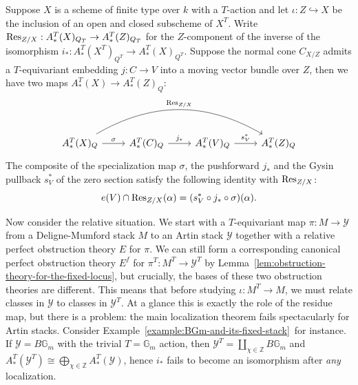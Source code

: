 \documentclass[12pt,dvipsnames]{amsart}
\begin{document}

\begin{prop}\label{rl-000R}\label{prop:edidin-graham-residue-identity}
  Suppose \(X\) is a scheme of finite type over \(k\) with a \(T\)-action and let \(\iota:Z\hookrightarrow X\) be the inclusion of an open and closed subscheme of \(X^T\). Write \(\operatorname{Res}_{Z/X}:A^T_*(X)_{Q_T}\to A^T_*(Z)_{Q_T}\) for the \(Z\)-component of the inverse of the isomorphism \(i_*:A^T_*(X^T)_{Q^T}\to A^T_*(X)_{Q^T}\). Suppose the normal cone \(C_{X/Z}\) admits a \(T\)-equivariant embedding \(j:C\to V\) into a moving vector bundle over \(Z\), then we have two maps \(A^T_*(X) \to A^T_*(Z)_{Q}\):
  \begin{equation*}
    \begin{tikzcd}
      A_*^T(X)_{Q} \arrow[rrr, bend left=30,"\Res_{Z/X}"]\arrow[r,"\sigma"] & A^T_*(C)_{Q} \arrow[r, "j_*"] & A^T_*(V)_{Q} \arrow[r,"s^*_V"] & A^T_*(Z)_Q
    \end{tikzcd}
  \end{equation*}
  The composite of the specialization map \(\sigma\), the pushforward \(j_*\) and the Gysin pullback \(s^*_V\) of the zero section satisfy the following identity with \(\operatorname{Res}_{Z/X}\):
  \begin{equation}\label{eqn:residue-identity}
    e(V) \cap \operatorname{Res}_{Z/X}(\alpha) = (s^*_V\circ j_*\circ \sigma)(\alpha).
  \end{equation}
\end{prop}

Now consider the relative situation. We start with a \(T\)-equivariant map \(\pi:M\to \mathcal Y\) from a Deligne-Mumford stack \(M\) to an Artin stack \(\mathcal Y\) together with a relative perfect obstruction theory \(E\) for \(\pi\). We can still form a corresponding canonical perfect obstruction theory \(E^f\) for \(\pi^T:M^T\to \mathcal Y^T\) by Lemma~\ref{lem:obstruction-theory-for-the-fixed-locus}, but crucially, the bases of these two obstruction theories are different. This means that before studying \(\iota:M^T\to M\), we must relate classes in \(\mathcal Y\) to classes in \(\mathcal Y^T\). At a glance this is exactly the role of the residue map, but there is a problem: the main localization theorem fails spectacularly for Artin stacks. Consider Example~\ref{example:BGm-and-its-fixed-stack}~for instance. If \(\mathcal Y = B\mathbb G_m\) with the trivial \(T = \mathbb G_m\) action, then \(\mathcal Y^T = \coprod_{\chi\in \mathbb Z}B\mathbb G_m\) and \(A^T_*(\mathcal Y^T)\cong \bigoplus_{\chi\in \mathbb Z} A^T_*(\mathcal Y)\), hence \(i_*\) fails to become an isomorphism after \emph{any} localization.
\end{document}
